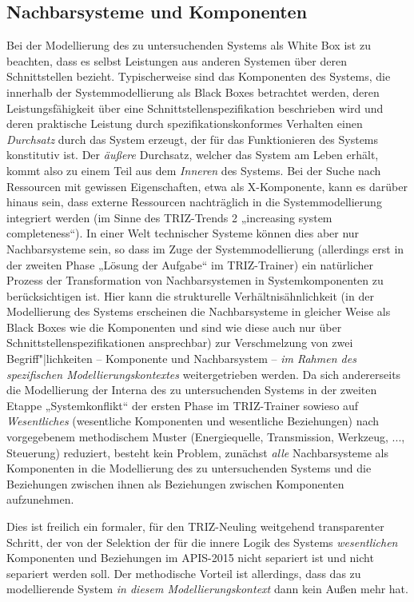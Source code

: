 \documentclass[11pt,a4paper]{article}
\begin{document}
\subsection*{Nachbarsysteme und Komponenten}

Bei der Modellierung des zu untersuchenden Systems als White Box ist zu
beachten, dass es selbst Leistungen aus anderen Systemen über deren
Schnittstellen bezieht. Typischerweise sind das Komponenten des Systems, die
innerhalb der Systemmodellierung als Black Boxes betrachtet werden, deren
Leistungsfähigkeit über eine Schnittstellenspezifikation beschrieben wird und
deren praktische Leistung durch spezifikationskonformes Verhalten einen
\emph{Durchsatz} durch das System erzeugt, der für das Funktionieren des
Systems konstitutiv ist. Der \emph{äußere} Durchsatz, welcher das System am
Leben erhält, kommt also zu einem Teil aus dem \emph{Inneren} des Systems.
Bei der Suche nach Ressourcen mit gewissen Eigenschaften, etwa als
X-Komponente, kann es darüber hinaus sein, dass externe Ressourcen
nachträglich in die Systemmodellierung integriert werden (im Sinne des
TRIZ-Trends 2 „increasing system completeness“). In einer Welt technischer
Systeme können dies aber nur Nachbarsysteme sein, so dass im Zuge der
Systemmodellierung (allerdings erst in der zweiten Phase „Lösung der Aufgabe“
im TRIZ-Trainer) ein natürlicher Prozess der Transformation von
Nachbarsystemen in Systemkomponenten zu berücksichtigen ist. Hier kann die
strukturelle Verhältnisähnlichkeit (in der Modellierung des Systems erscheinen
die Nachbarsysteme in gleicher Weise als Black Boxes wie die Komponenten und
sind wie diese auch nur über Schnittstellenspezifikationen ansprechbar) zur
Verschmelzung von zwei Begriff"|lichkeiten -- Komponente und Nachbarsystem --
\emph{im Rahmen des spezifischen Modellierungskontextes} weitergetrieben
werden. Da sich andererseits die Modellierung der Interna des zu
untersuchenden Systems in der zweiten Etappe „Systemkonflikt“ der ersten Phase
im TRIZ-Trainer sowieso auf \emph{Wesentliches} (wesentliche Komponenten und
wesentliche Beziehungen) nach vorgegebenem methodischem Muster (Energiequelle,
Transmission, Werkzeug, ..., Steuerung) reduziert, besteht kein Problem,
zunächst \emph{alle} Nachbarsysteme als Komponenten in die Modellierung des zu
untersuchenden Systems und die Beziehungen zwischen ihnen als Beziehungen
zwischen Komponenten aufzunehmen.

Dies ist freilich ein formaler, für den TRIZ-Neuling weitgehend transparenter
Schritt, der von der Selektion der für die innere Logik des Systems
\emph{wesentlichen} Komponenten und Beziehungen im APIS-2015 nicht separiert
ist und nicht separiert werden soll.  Der methodische Vorteil ist allerdings,
dass das zu modellierende System \emph{in diesem Modellierungskontext} dann
kein Außen mehr hat.
\end{document}
